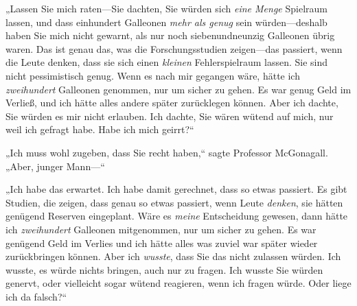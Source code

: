 „Lassen Sie mich raten—Sie dachten, Sie würden sich \emph{eine Menge} Spielraum lassen, und dass einhundert Galleonen \emph{mehr als genug} sein würden—deshalb haben Sie mich nicht gewarnt, als nur noch siebenundneunzig Galleonen übrig waren. Das ist genau das, was die Forschungsstudien zeigen—das passiert, wenn die Leute denken, dass sie sich einen \emph{kleinen} Fehlerspielraum lassen. Sie sind nicht pessimistisch genug. Wenn es nach mir gegangen wäre, hätte ich \emph{zweihundert} Galleonen genommen, nur um sicher zu gehen. Es war genug Geld im Verließ, und ich hätte alles andere später zurücklegen können. Aber ich dachte, Sie würden es mir nicht erlauben. Ich dachte, Sie wären wütend auf mich, nur weil ich gefragt habe. Habe ich mich geirrt?“

„Ich muss wohl zugeben, dass Sie recht haben,“ sagte Professor McGonagall. „Aber, junger Mann—“

„Ich habe das erwartet. Ich habe damit gerechnet, dass so etwas passiert. Es gibt Studien, die zeigen, dass genau so etwas passiert, wenn Leute \emph{denken}, sie hätten genügend Reserven eingeplant. Wäre es \emph{meine} Entscheidung gewesen, dann hätte ich \emph{zweihundert} Galleonen mitgenommen, nur um sicher zu gehen. Es war genügend Geld im Verlies und ich hätte alles was zuviel war später wieder zurückbringen können. Aber ich \emph{wusste}, dass Sie das nicht zulassen würden. Ich wusste, es würde nichts bringen, auch nur zu fragen. Ich wusste Sie würden genervt, oder vielleicht sogar wütend reagieren, wenn ich fragen würde. Oder liege ich da falsch?“

